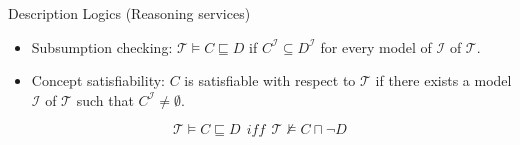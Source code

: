 \documentclass{beamer}
\begin{document}
\begin{frame}{Description Logics (Reasoning services)}
\begin{itemize}
\item Subsumption checking: $\mathcal{T}\vDash C\sqsubseteq D$ if $C^\mathcal{I}\subseteq D^\mathcal{I}$ for every model of $\mathcal{I}$ of $\mathcal{T}$.
\item Concept satisfiability: $C$ is satisfiable with respect to $\mathcal{T}$ if there exists a model $\mathcal{I}$ of $\mathcal{T}$ such that $C^\mathcal{I}\neq \emptyset$.
\end{itemize}
\begin{block}{}
 $$ \mathcal{T}\vDash C\sqsubseteq D~~iff~~\mathcal{T}\nvDash C\sqcap \neg D $$
\end{block}
\end{frame}
\end{document}

